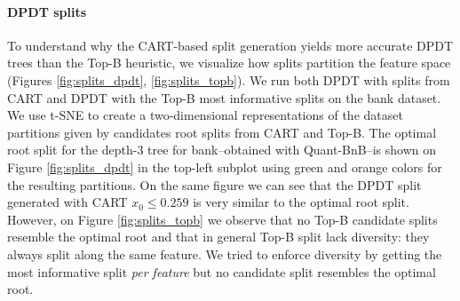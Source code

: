\paragraph{DPDT splits} To understand why the CART-based split generation yields more accurate DPDT trees than the Top-B heuristic, we visualize how splits partition the feature space (Figures \ref{fig:splits_dpdt}, \ref{fig:splits_topb}). We run both DPDT with splits from CART and DPDT with the Top-B most informative splits on the bank dataset. We use t-SNE to create a two-dimensional representations of the dataset partitions given by candidates root splits from CART and Top-B. 
The optimal root split for the depth-3 tree for bank--obtained with Quant-BnB--is shown on Figure \ref{fig:splits_dpdt} in the top-left subplot using green and orange colors for the resulting partitions. On the same figure we can see that the DPDT split generated with CART $x_0 \leq 0.259$ is very similar to the optimal root split. However, on Figure \ref{fig:splits_topb} we observe that no Top-B candidate splits resemble the optimal root and that in general Top-B split lack diversity: they always split along the same feature. We tried to enforce diversity by getting the most informative split \textit{per feature} but no candidate split resembles the optimal root.

